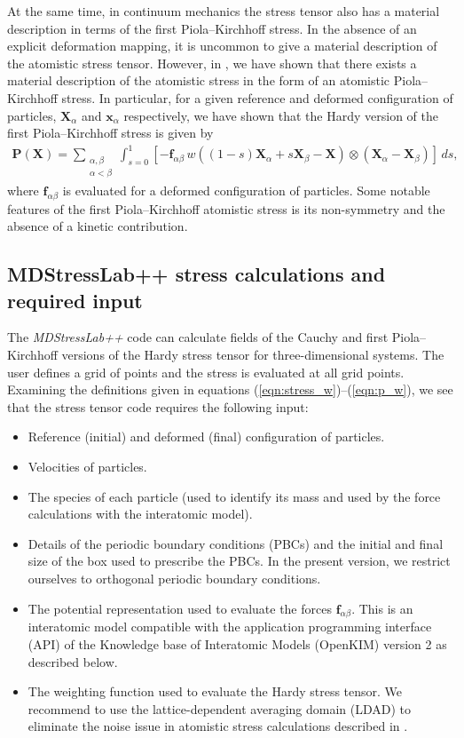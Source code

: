 \documentclass[authoryear]{elsarticle}
\newcommand{\MDStressLab}{\emph{MDStressLab++}\xspace}
\newcommand{\eref}[1]{(\ref{#1})}
\begin{document}
At the same time, in continuum
mechanics the stress tensor also has a material description in terms of the
first Piola--Kirchhoff stress. In the absence of an explicit deformation
mapping, it is uncommon to give a material description of the atomistic stress
tensor.
However,
in \cite{admal:tadmor:2015}, we have shown that there exists a material description of
the atomistic stress in the form of an atomistic Piola--Kirchhoff stress. In
particular, for a given reference and deformed configuration of particles, $\bm
X_\alpha$ and $\bm x_\alpha$ respectively,
we have shown that the Hardy version of the first Piola--Kirchhoff stress is given by
\begin{align}
    \bm P(\bm X) =
    \sum_{\substack{\alpha,\beta \\  \alpha < \beta}} \int_{s=
    0}^{1} [-\bm{f}_{\alpha\beta}\, w((1-s)\bm{X}_\alpha + s\bm{X}_\beta-\bm{X})
    \otimes (\bm{X}_\alpha - \bm{X}_\beta)] \, ds, \label{eqn:p_w}
\end{align}
where $\bm f_{\alpha\beta}$ is evaluated for a deformed configuration of
particles.
Some notable features of the first Piola--Kirchhoff atomistic stress is its non-symmetry and the
absence of a kinetic contribution.

\subsection{MDStressLab++ stress calculations and required input}
The \MDStressLab code can calculate fields of the Cauchy and
first Piola--Kirchhoff versions of the Hardy stress tensor for three-dimensional systems.
The user defines a grid of points and the stress is evaluated at all grid points.
Examining the definitions given in
equations \eref{eqn:stress_w}--\eref{eqn:p_w}, we see that the stress tensor code
requires the following input:
\begin{itemize}
    \item Reference (initial) and deformed (final) configuration of particles.
    \item Velocities of particles.
    \item The species of each particle (used to identify its mass and used by the force calculations with the interatomic model).
    \item Details of the periodic boundary conditions (PBCs) and the initial and final size of
        the box used to prescribe the PBCs. In the present version, we restrict
        ourselves to orthogonal periodic boundary conditions.
    \item The potential representation used to evaluate the forces $\bm f_{\alpha\beta}$. This is an interatomic model compatible with the application programming interface (API) of the Knowledge base of Interatomic Models (OpenKIM) version 2 as described below.
    \item The weighting function used to evaluate the Hardy stress
        tensor. We recommend to use the lattice-dependent averaging domain (LDAD) to eliminate the noise issue in atomistic stress calculations described in \cite{shi2020noise}.
\end{itemize}
\end{document}
